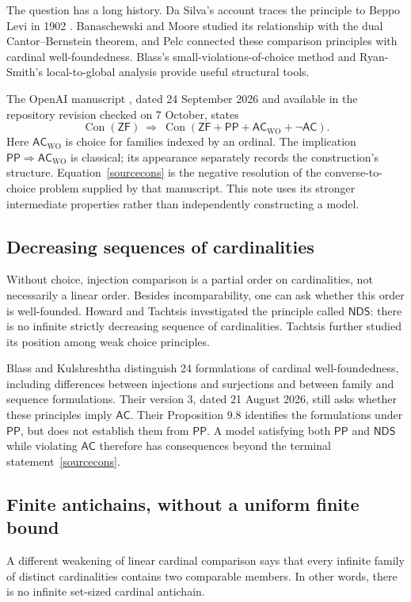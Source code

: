 \documentclass[11pt,a4paper]{article}
\newcommand{\ZF}{\mathsf{ZF}}
\newcommand{\AC}{\mathsf{AC}}
\newcommand{\ACWO}{\mathsf{AC}_{\mathrm{WO}}}
\newcommand{\PP}{\mathsf{PP}}
\newcommand{\NDS}{\mathsf{NDS}}
\newcommand{\Con}{\operatorname{Con}}
\theoremstyle{definition}
\theoremstyle{remark}
\begin{document}
The question has a long history. Da Silva's account traces the principle to Beppo Levi in 1902 \cite[Section 2]{daSilva}. Banaschewski and Moore \cite{BM} studied its relationship with the dual Cantor--Bernstein theorem, and Pelc \cite{Pelc} connected these comparison principles with cardinal well-foundedness. Blass's small-violations-of-choice method \cite{Blass} and Ryan-Smith's local-to-global analysis \cite{RyanSmith} provide useful structural tools.

The OpenAI manuscript \cite[Theorem 1.1]{OpenAI}, dated 24 September 2026 and available in the repository revision checked on 7 October, states
\begin{equation}\label{sourcecons}
 \Con(\ZF)\ \Longrightarrow\
 \Con(\ZF+\PP+\ACWO+\neg\AC).
\end{equation}
Here $\ACWO$ is choice for families indexed by an ordinal. The implication $\PP\Rightarrow\ACWO$ is classical; its appearance separately records the construction's structure. Equation~\eqref{sourcecons} is the negative resolution of the converse-to-choice problem supplied by that manuscript. This note uses its stronger intermediate properties rather than independently constructing a model.

\subsection{Decreasing sequences of cardinalities}
Without choice, injection comparison is a partial order on cardinalities, not necessarily a linear order. Besides incomparability, one can ask whether this order is well-founded. Howard and Tachtsis \cite{HT} investigated the principle called $\NDS$: there is no infinite strictly decreasing sequence of cardinalities. Tachtsis \cite{Tachtsis2024} further studied its position among weak choice principles.

Blass and Kulshreshtha \cite{BK} distinguish 24 formulations of cardinal well-foundedness, including differences between injections and surjections and between family and sequence formulations. Their version 3, dated 21 August 2026, still asks whether these principles imply $\AC$. Their Proposition 9.8 identifies the formulations under $\PP$, but does not establish them from $\PP$. A model satisfying both $\PP$ and $\NDS$ while violating $\AC$ therefore has consequences beyond the terminal statement~\eqref{sourcecons}.

\subsection{Finite antichains, without a uniform finite bound}
A different weakening of linear cardinal comparison says that every infinite family of distinct cardinalities contains two comparable members. In other words, there is no infinite set-sized cardinal antichain.
\end{document}
